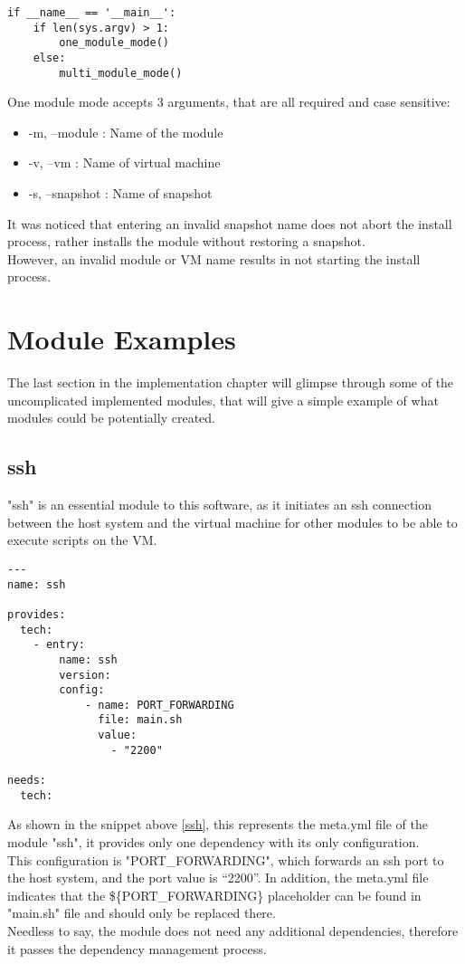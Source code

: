 \begin{lstlisting}[caption=One module function, style=pythonstyle, label=if_main]
if __name__ == '__main__':
    if len(sys.argv) > 1:
        one_module_mode()
    else:
        multi_module_mode()
\end{lstlisting}

One module mode accepts 3 arguments, that are all required and case sensitive:
\begin{itemize}
  \item -m, --module : Name of the module
  \item -v, --vm : Name of virtual machine
  \item -s, --snapshot : Name of snapshot
\end{itemize}


It was noticed that entering an invalid snapshot name does not abort the install process, rather installs the module without restoring a snapshot.\\
However, an invalid module or VM name results in not starting the install process.

\clearpage


\section{Module Examples}
The last section in the implementation chapter will glimpse through some of the uncomplicated implemented modules, that will give a simple example of what modules could be potentially created.

\subsection{ssh}
"ssh" is an essential module to this software, as it initiates an ssh connection between the host system and the virtual machine for other modules to be able to execute scripts on the VM.

\begin{lstlisting}[caption=ssh metadata, style=pythonstyle, label=ssh]
---
name: ssh

provides:
  tech:
    - entry:
        name: ssh
        version:
        config:
            - name: PORT_FORWARDING
              file: main.sh
              value:
                - "2200"

needs:
  tech:
\end{lstlisting}

As shown in the snippet above \ref{ssh}, this represents the meta.yml file of the module "ssh", it provides only one dependency with its only configuration.\\
This configuration is "PORT\_FORWARDING", which forwards an ssh port to the host system, and the port value is “2200”. In addition, the meta.yml file indicates that the \$\{PORT\_FORWARDING\} placeholder can be found in "main.sh" file and should only be replaced there.\\ Needless to say, the module does not need any additional dependencies, therefore it passes the dependency management process.

